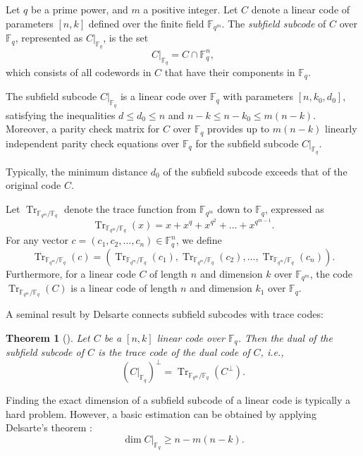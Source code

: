\documentclass[11pt]{amsart}
\theoremstyle{plain}
\newtheorem{theorem}{Theorem}[section]
\theoremstyle{definition}
\theoremstyle{remark}
\DeclareMathOperator{\trace}{Tr}
\newcommand{\fq}{\mathbb{F}_{q}}
\begin{document}
Let $q$ be a prime power, and $m$ a positive integer. Let $C$ denote a linear code of parameters $[n,k]$ defined over the finite field $\mathbb{F}_{q^m}$. The \emph{subfield subcode} of $C$ over $\mathbb{F}_q$, represented as $C|_{\mathbb{F}_q}$, is the set
\[
	C|_{\mathbb{F}_q} = C \cap \mathbb{F}_q^n,
\]
which consists of all codewords in $C$ that have their components in $\mathbb{F}_q$. 


The subfield subcode $C|_{\mathbb{F}_q}$ is a linear code over $\mathbb{F}_q$ with parameters $[n,k_0,d_0]$, satisfying the inequalities $d \leq d_0 \leq n$ and $n-k \leq n-k_0 \leq m(n-k)$. Moreover, a parity check matrix for $C$ over $\mathbb{F}_q$ provides up to $m(n-k)$ linearly independent parity check equations over $\mathbb{F}_q$ for the subfield subcode $C|_{\mathbb{F}_q}$.

Typically, the minimum distance $d_0$ of the subfield subcode exceeds that of the original code $C$.

Let $\trace_{\mathbb{F}_{q^m} / \mathbb{F}_q}$ denote the trace function from $\mathbb{F}_{q^m}$ down to $\mathbb{F}_q$, expressed as
\[
	\trace_{\mathbb{F}_{q^m} / \mathbb{F}_q}(x) = x + x^q + x^{q^2} + \ldots + x^{q^{m-1}}.
\]
For any vector $c = (c_1, c_2, \ldots, c_n) \in \mathbb{F}_q^n$, we define
\[
	\trace_{\mathbb{F}_{q^m} / \mathbb{F}_q}(c) = \left( \trace_{\mathbb{F}_{q^m} / \mathbb{F}_q}(c_1), \trace_{\mathbb{F}_{q^m} / \mathbb{F}_q}(c_2), \ldots, \trace_{\mathbb{F}_{q^m} / \mathbb{F}_q}(c_n) \right).
\]
Furthermore, for a linear code $C$ of length $n$ and dimension $k$ over $\mathbb{F}_{q^m}$, the code $\trace_{\mathbb{F}_{q^m} / \mathbb{F}_q}(C)$ is a linear code of length $n$ and dimension $k_1$ over $\mathbb{F}_q$.

A seminal result by Delsarte connects subfield subcodes with trace codes:

\begin{theorem}[\cite{Del75}]\label{delsarte}
	Let $C$ be a $[n,k]$ linear code over $\mathbb{F}_q$. Then the dual of the subfield subcode of $C$ is the trace code of the dual code of $C$, i.e., 
	\[
		(C|_{\mathbb{F}_q})^{\perp} = \trace_{\mathbb{F}_{q^m} / \mathbb{F}_q}(C^{\perp}).
	\]
\end{theorem}
Finding the exact dimension of a subfield subcode of a linear code is typically a hard problem. However, a basic estimation can be obtained by applying Delsarte's theorem {\cite{Del75}}:
\begin{equation}
	\dim C|_{\fq} \geq n - m(n-k).
\end{equation}
\end{document}
